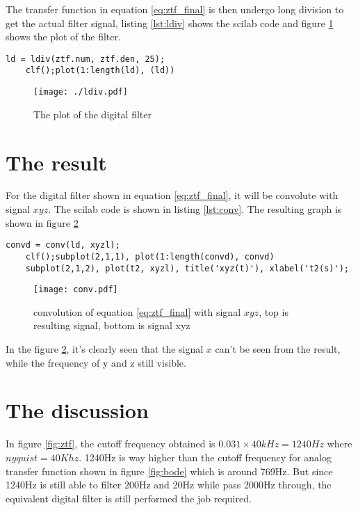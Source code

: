 \documentclass{article}
\begin{document}
The transfer function in equation \ref{eq:ztf_final} is then undergo long division to get the actual filter signal, listing \ref{lst:ldiv} shows the scilab code and figure \ref{fig:ldiv} shows the plot of the filter.

\begin{lstlisting}[linewidth=8cm, label={lst:ldiv}, caption={scilab code for long division}]
    ld = ldiv(ztf.num, ztf.den, 25);
    clf();plot(1:length(ld), (ld))
\end{lstlisting}

\begin{figure}[htpb]
    \centering
    \texttt{[image: ./ldiv.pdf]}
    \caption{The plot of the digital filter}
    \label{fig:ldiv}
\end{figure}

\section{The result}
For the digital filter shown in equation \ref{eq:ztf_final}, it will be convolute with signal $xyz$. The scilab code is shown in listing \ref{lst:conv}. The resulting graph is shown in figure \ref{fig:conv}

\begin{minipage}{\linewidth}
\begin{lstlisting}[linewidth=16cm, caption={scilab code for convolution with signal xyz}, label={lst:conv}]
    convd = conv(ld, xyzl);
    clf();subplot(2,1,1), plot(1:length(convd), convd)
    subplot(2,1,2), plot(t2, xyzl), title('xyz(t)'), xlabel('t2(s)'); 
\end{lstlisting}
\end{minipage}

\begin{figure}[htpb]
    \centering
    \texttt{[image: conv.pdf]}
    \caption{convolution of equation \ref{eq:ztf_final} with signal $xyz$, top is resulting signal, bottom is signal xyz}
    \label{fig:conv}
\end{figure}

In the figure \ref{fig:conv}, it's clearly seen that the signal $x$ can't be seen from the result, while the frequency of y and z still visible.

\section{The discussion}
In figure \ref{fig:ztf}, the cutoff frequency obtained is $0.031 \times 40kHz = 1240Hz$ where $nyquist = 40Khz$. 1240Hz is way higher than the cutoff frequency for analog transfer function shown in figure \ref{fig:bode} which is around 769Hz. But since 1240Hz is still able to filter 200Hz and 20Hz while pass 2000Hz through, the equivalent digital filter is still performed the job required.
\end{document}
